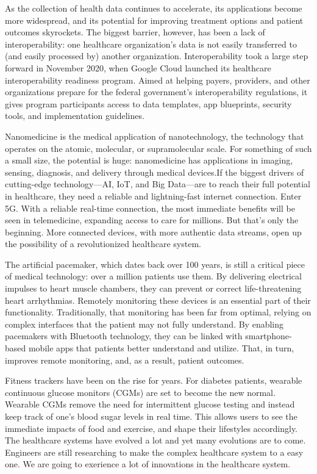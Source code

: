 \documentclass[12pt]{article}
\begin{document}
\indent

As the collection of health data continues to accelerate, its applications become more widespread, and its potential for improving treatment options and patient outcomes skyrockets. The biggest barrier, however, has been a lack of interoperability: one healthcare organization’s data is not easily transferred to (and easily processed by) another organization. Interoperability took a large step forward in November 2020, when Google Cloud launched its healthcare interoperability readiness program. Aimed at helping payers, providers, and other organizations prepare for the federal government’s interoperability regulations, it gives program participants access to data templates, app blueprints, security tools, and implementation guidelines.

\indent

Nanomedicine is the medical application of nanotechnology, the technology that operates on the atomic, molecular, or supramolecular scale. For something of such a small size, the potential is huge: nanomedicine has applications in imaging, sensing, diagnosis, and delivery through medical devices.If the biggest drivers of cutting-edge technology—AI, IoT, and Big Data—are to reach their full potential in healthcare, they need a reliable and lightning-fast internet connection. Enter 5G. With a reliable real-time connection, the most immediate benefits will be seen in telemedicine, expanding access to care for millions. But that’s only the beginning. More connected devices, with more authentic data streams, open up the possibility of a revolutionized healthcare system.

\indent

The artificial pacemaker, which dates back over 100 years, is still a critical piece of medical technology: over a million patients use them. By delivering electrical impulses to heart muscle chambers, they can prevent or correct life-threatening heart arrhythmias. Remotely monitoring these devices is an essential part of their functionality. Traditionally, that monitoring has been far from optimal, relying on complex interfaces that the patient may not fully understand. By enabling pacemakers with Bluetooth technology, they can be linked with smartphone-based mobile apps that patients better understand and utilize. That, in turn, improves remote monitoring, and, as a result, patient outcomes.

\indent

Fitness trackers have been on the rise for years. For diabetes patients, wearable continuous glucose monitors (CGMs) are set to become the new normal. Wearable CGMs remove the need for intermittent glucose testing and instead keep track of one’s blood sugar levels in real time. This allows users to see the immediate impacts of food and exercise, and shape their lifestyles accordingly. The healthcare systems have evolved a lot and yet many evolutions are to come. Engineers are still researching to make the complex healthcare system to a easy one. We are going to exerience a lot of innovations in the healthcare system.
\end{document}
